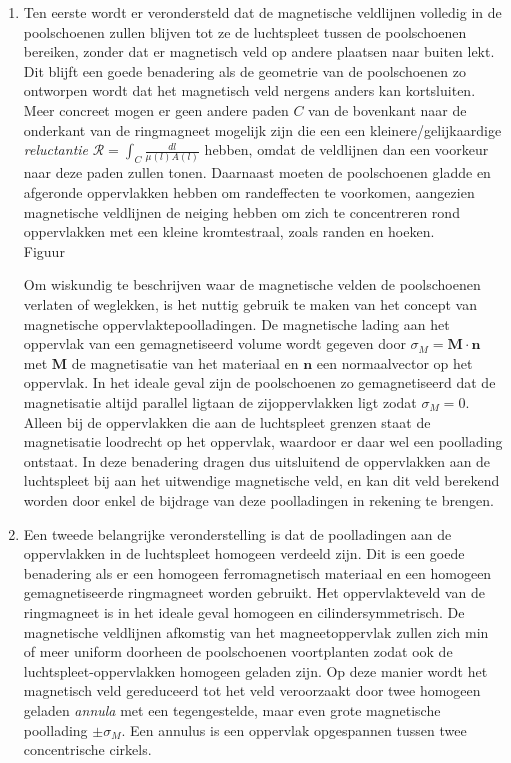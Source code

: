 \documentclass[we,twoside,openright,a4paper,11pt]{uantwerpenbamathesis}
\begin{document}
\begin{enumerate}
    \item Ten eerste wordt er verondersteld dat de magnetische veldlijnen volledig in de poolschoenen zullen blijven tot ze de luchtspleet tussen de poolschoenen bereiken, zonder dat er magnetisch veld op andere plaatsen naar buiten lekt. Dit blijft een goede benadering als de geometrie van de poolschoenen zo ontworpen wordt dat het magnetisch veld nergens anders kan kortsluiten. Meer concreet mogen er geen andere paden $C$ van de bovenkant naar de onderkant van de ringmagneet mogelijk zijn die een een kleinere/gelijkaardige \textit{reluctantie} $\mathcal{R}=\int_C\frac{dl}{\mu(l)A(l)}$ hebben, omdat de veldlijnen dan een voorkeur naar deze paden zullen tonen. Daarnaast moeten de poolschoenen gladde en afgeronde oppervlakken hebben om randeffecten te voorkomen, aangezien magnetische veldlijnen de neiging hebben om zich te concentreren rond oppervlakken met een kleine kromtestraal, zoals randen en hoeken.\\
    \color{red} Figuur\color{black}

    Om wiskundig te beschrijven waar de magnetische velden de poolschoenen verlaten of weglekken, is het nuttig gebruik te maken van het concept van magnetische oppervlaktepoolladingen. De magnetische lading aan het oppervlak van een gemagnetiseerd volume wordt gegeven door $\sigma_M=\mathbf{M}\cdot\mathbf{n}$ met $\mathbf{M}$ de magnetisatie van het materiaal en $\mathbf{n}$ een normaalvector op het oppervlak. In het ideale geval zijn de poolschoenen zo gemagnetiseerd dat de magnetisatie altijd parallel ligtaan de zijoppervlakken ligt zodat $\sigma_M=0$. Alleen bij de oppervlakken die aan de luchtspleet grenzen staat de magnetisatie loodrecht op het oppervlak, waardoor er daar wel een poollading ontstaat. In deze benadering dragen dus uitsluitend de oppervlakken aan de luchtspleet bij aan het uitwendige magnetische veld, en kan dit veld berekend worden door enkel de bijdrage van deze poolladingen in rekening te brengen.\\

    \item Een tweede belangrijke veronderstelling is dat de poolladingen aan de oppervlakken in de luchtspleet homogeen verdeeld zijn. Dit is een goede benadering als er een homogeen ferromagnetisch materiaal en een homogeen gemagnetiseerde ringmagneet worden gebruikt. Het oppervlakteveld van de ringmagneet is in het ideale geval homogeen en cilindersymmetrisch. De magnetische veldlijnen afkomstig van het magneetoppervlak zullen zich min of meer uniform doorheen de poolschoenen voortplanten zodat ook de luchtspleet-oppervlakken homogeen geladen zijn. Op deze manier wordt het magnetisch veld gereduceerd tot het veld veroorzaakt door twee homogeen geladen \textit{annula} met een tegengestelde, maar even grote magnetische poollading $\pm\sigma_M$. Een annulus is een oppervlak opgespannen tussen twee concentrische cirkels.\\
\end{enumerate}
\end{document}
